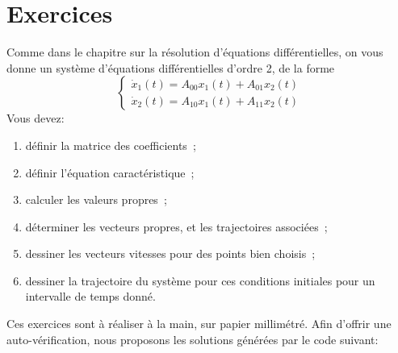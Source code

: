     \section{Exercices}
        Comme dans le chapitre sur la résolution d'équations différentielles, on vous donne un système d'équations différentielles d'ordre 2, de la forme 
        \begin{equation}
            \begin{cases}
                \dot{x}_1(t) = A_{00} x_1(t) + A_{01} x_2(t)\\
                \dot{x}_2(t) = A_{10} x_1(t) + A_{11} x_2(t)
            \end{cases}
        \end{equation}
        Vous devez:
        \begin{enumerate}
            \item définir la matrice des coefficients~;
            \item définir l'équation caractéristique~;
            \item calculer les valeurs propres~;
            \item déterminer les vecteurs propres, et les trajectoires associées~;
            \item dessiner les vecteurs vitesses pour des points bien choisis~;
            \item dessiner la trajectoire du système pour ces conditions initiales pour un intervalle de temps donné.
        \end{enumerate}
        Ces exercices sont à réaliser à la main, sur papier millimétré. Afin d'offrir une auto-vérification, nous proposons les solutions générées par le code suivant:
        \inputminted{python}{codes/correction_pdp_1.py}
        
